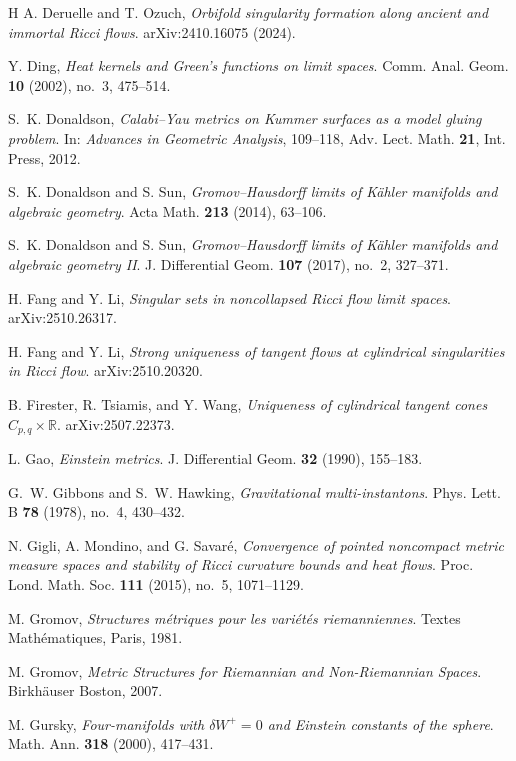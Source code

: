 \documentclass[11pt,reqno]{amsart}
\numberwithin{equation}{section}
\theoremstyle{definition}
\theoremstyle{remark}
\begin{document}
\begin{thebibliography}{H}
A. Deruelle and T. Ozuch,
\textit{Orbifold singularity formation along ancient and immortal Ricci flows}.
arXiv:2410.16075 (2024).

Y. Ding,
\textit{Heat kernels and Green’s functions on limit spaces}.
Comm. Anal. Geom. \textbf{10} (2002), no.~3, 475--514.

S.~K. Donaldson,
\textit{Calabi--Yau metrics on Kummer surfaces as a model gluing problem}.
In: \emph{Advances in Geometric Analysis}, 109--118,
Adv. Lect. Math. \textbf{21}, Int. Press, 2012.

S.~K. Donaldson and S. Sun,
\textit{Gromov--Hausdorff limits of Kähler manifolds and algebraic geometry}.
Acta Math. \textbf{213} (2014), 63--106.

S.~K. Donaldson and S. Sun,
\textit{Gromov--Hausdorff limits of Kähler manifolds and algebraic geometry II}.
J. Differential Geom. \textbf{107} (2017), no.~2, 327--371.

H. Fang and Y. Li,
\textit{Singular sets in noncollapsed Ricci flow limit spaces}.
arXiv:2510.26317.

H. Fang and Y. Li,
\textit{Strong uniqueness of tangent flows at cylindrical singularities in Ricci flow}.
arXiv:2510.20320.

B. Firester, R. Tsiamis, and Y. Wang,
\textit{Uniqueness of cylindrical tangent cones $C_{p,q}\times\mathbb{R}$}.
arXiv:2507.22373.

L. Gao,
\textit{Einstein metrics}.
J. Differential Geom. \textbf{32} (1990), 155--183.

G.~W. Gibbons and S.~W. Hawking,
\textit{Gravitational multi-instantons}.
Phys. Lett. B \textbf{78} (1978), no.~4, 430--432.

N. Gigli, A. Mondino, and G. Savaré,
\textit{Convergence of pointed noncompact metric measure spaces and stability of Ricci curvature bounds and heat flows}.
Proc. Lond. Math. Soc. \textbf{111} (2015), no.~5, 1071--1129.

M. Gromov,
\textit{Structures métriques pour les variétés riemanniennes}.
Textes Mathématiques, Paris, 1981.

M. Gromov,
\textit{Metric Structures for Riemannian and Non-Riemannian Spaces}.
Birkhäuser Boston, 2007.

M. Gursky,
\textit{Four-manifolds with $\delta W^+=0$ and Einstein constants of the sphere}.
Math. Ann. \textbf{318} (2000), 417--431.


\end{thebibliography}
\end{document}
